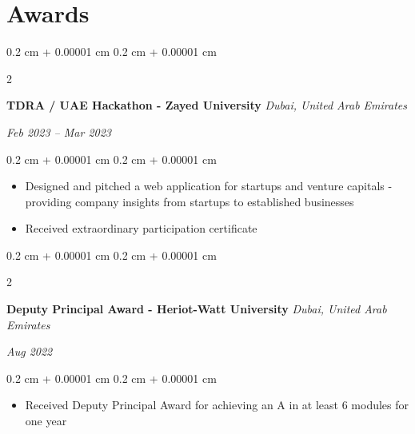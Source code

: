\documentclass[10pt, letterpaper]{article}
\newenvironment{highlights}{
    \begin{itemize}[
        topsep=0.10 cm,
        parsep=0.10 cm,
        partopsep=0pt,
        itemsep=0pt,
        leftmargin=0.4 cm + 10pt
    ]
}{
    \end{itemize}
} %
\newenvironment{onecolentry}{
    \begin{adjustwidth}{
        0.2 cm + 0.00001 cm
    }{
        0.2 cm + 0.00001 cm
    }
}{
    \end{adjustwidth}
} %
\newenvironment{twocolentry}[2][]{
    \onecolentry
    \def\secondColumn{#2}
    \setcolumnwidth{\fill, 4.5 cm}
    \begin{paracol}{2}
}{
    \switchcolumn \raggedleft \secondColumn
    \end{paracol}
    \endonecolentry
} %
\begin{document}
        \section{Awards}
    \begin{twocolentry}{
        \textit{Feb 2023 – Mar 2023}}
        \textbf{TDRA / UAE Hackathon - Zayed University}
        \textit{Dubai, United Arab Emirates}
    \end{twocolentry}
    \vspace{0.10 cm}
    \begin{onecolentry}
        \begin{highlights}
            \item Designed and pitched a web application for startups and venture capitals - providing company insights from startups to established businesses 
            \item Received extraordinary participation certificate
        \end{highlights}
    \end{onecolentry}
        \vspace{0.2 cm}
            \begin{twocolentry}{
        \textit{Aug 2022}}
        \textbf{Deputy Principal Award - Heriot-Watt University}
        \textit{Dubai, United Arab Emirates}
    \end{twocolentry}
    \vspace{0.10 cm}
    \begin{onecolentry}
        \begin{highlights}
            \item Received Deputy Principal Award for achieving an A in at least 6 modules for one year  
        \end{highlights}
    \end{onecolentry}
        \vspace{0.2 cm}

\end{document}
